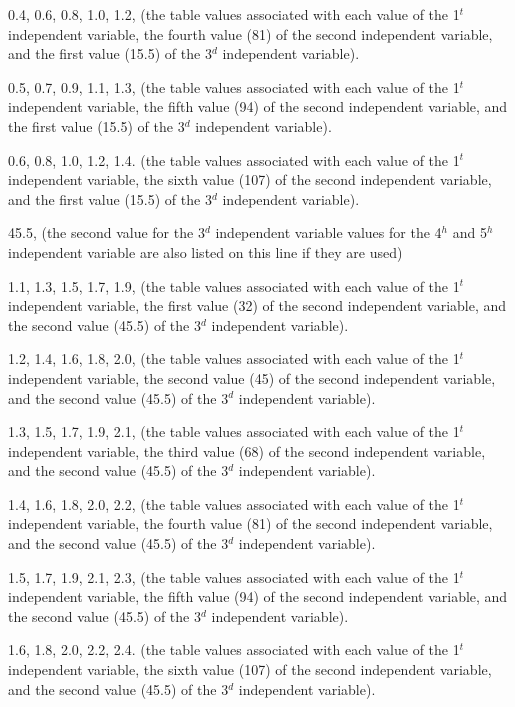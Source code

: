 0.4, 0.6, 0.8, 1.0, 1.2, (the table values associated with each value of the 1\(^{t}\) independent variable, the fourth value (81) of the second independent variable, and the first value (15.5) of the 3\(^{d}\) independent variable).

0.5, 0.7, 0.9, 1.1, 1.3, (the table values associated with each value of the 1\(^{t}\) independent variable, the fifth value (94) of the second independent variable, and the first value (15.5) of the 3\(^{d}\) independent variable).

0.6, 0.8, 1.0, 1.2, 1.4. (the table values associated with each value of the 1\(^{t}\) independent variable, the sixth value (107) of the second independent variable, and the first value (15.5) of the 3\(^{d}\) independent variable).

45.5, (the second value for the 3\(^{d}\) independent variable values for the 4\(^{h}\) and 5\(^{h}\) independent variable are also listed on this line if they are used)

1.1, 1.3, 1.5, 1.7, 1.9, (the table values associated with each value of the 1\(^{t}\) independent variable, the first value (32) of the second independent variable, and the second value (45.5) of the 3\(^{d}\) independent variable).

1.2, 1.4, 1.6, 1.8, 2.0, (the table values associated with each value of the 1\(^{t}\) independent variable, the second value (45) of the second independent variable, and the second value (45.5) of the 3\(^{d}\) independent variable).

1.3, 1.5, 1.7, 1.9, 2.1, (the table values associated with each value of the 1\(^{t}\) independent variable, the third value (68) of the second independent variable, and the second value (45.5) of the 3\(^{d}\) independent variable).

1.4, 1.6, 1.8, 2.0, 2.2, (the table values associated with each value of the 1\(^{t}\) independent variable, the fourth value (81) of the second independent variable, and the second value (45.5) of the 3\(^{d}\) independent variable).

1.5, 1.7, 1.9, 2.1, 2.3, (the table values associated with each value of the 1\(^{t}\) independent variable, the fifth value (94) of the second independent variable, and the second value (45.5) of the 3\(^{d}\) independent variable).

1.6, 1.8, 2.0, 2.2, 2.4. (the table values associated with each value of the 1\(^{t}\) independent variable, the sixth value (107) of the second independent variable, and the second value (45.5) of the 3\(^{d}\) independent variable).

